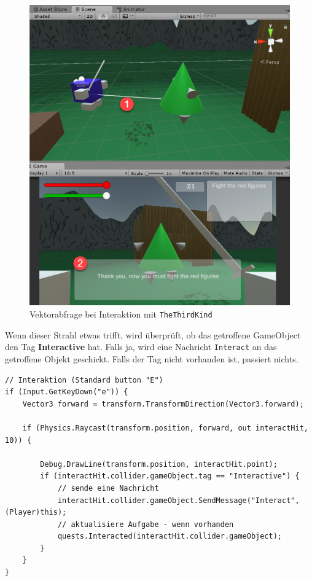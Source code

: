 \begin{figure}[H]
\includegraphics[scale=0.5]{screenshots/raycastthirdkind.png}
\caption{Vektorabfrage bei Interaktion mit \lstinline{TheThirdKind}}
\end{figure}

Wenn dieser Strahl etwas trifft, wird überprüft, ob das getroffene GameObject den Tag \textbf{Interactive} hat. Falls ja, wird eine Nachricht \lstinline{Interact} an das getroffene Objekt geschickt. Falls der Tag nicht vorhanden ist, passiert nichts.

\begin{lstlisting}[caption={Auslösen der Interaktion}]
// Interaktion (Standard button "E")
if (Input.GetKeyDown("e")) {
	Vector3 forward = transform.TransformDirection(Vector3.forward);

	if (Physics.Raycast(transform.position, forward, out interactHit, 10)) {	
		
		Debug.DrawLine(transform.position, interactHit.point);
		if (interactHit.collider.gameObject.tag == "Interactive") {
			// sende eine Nachricht
			interactHit.collider.gameObject.SendMessage("Interact", (Player)this);
			// aktualisiere Aufgabe - wenn vorhanden
			quests.Interacted(interactHit.collider.gameObject);
		}
	}	
}
\end{lstlisting}


